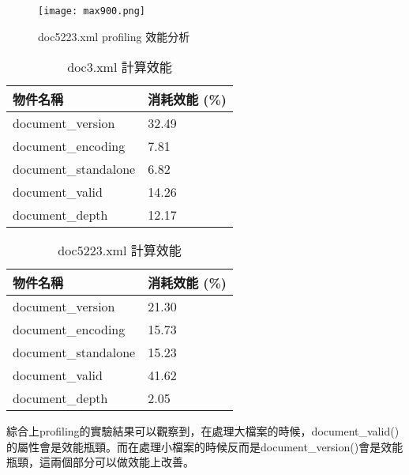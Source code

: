 \begin{figure}[H]
\centering
\graphicspath{{/Users/FUDA/Documents/masterThesis/image/}}
\texttt{[image: max900.png]}
\caption{doc5223.xml profiling 效能分析}
\label{max900}
\end{figure}

\begin{table}[H]
\caption{doc3.xml 計算效能}
\label{doc3pro}
\begin{center}
\begin{tabular}{|p{4cm}<{\centering}|p{3cm}<{\centering}|}
\hline
物件名稱 & 消耗效能 (\%)\\
\hline
document\_version & 32.49 \\
\hline
document\_encoding & 7.81 \\
\hline
document\_standalone & 6.82 \\
\hline
document\_valid & 14.26 \\
\hline
document\_depth & 12.17 \\
\hline
\end{tabular}
\end{center}
\end{table}

\begin{table}[H]
\caption{doc5223.xml 計算效能}
\label{doc5223pro}
\begin{center}
\begin{tabular}{|p{4cm}<{\centering}|p{3cm}<{\centering}|}
\hline
物件名稱 & 消耗效能 (\%)\\
\hline
document\_version & 21.30 \\
\hline
document\_encoding & 15.73 \\
\hline
document\_standalone & 15.23 \\
\hline
document\_valid & 41.62 \\
\hline
document\_depth & 2.05 \\
\hline
\end{tabular}
\end{center}
\end{table}

綜合上profiling的實驗結果可以觀察到，在處理大檔案的時候，document\_valid()的屬性會是效能瓶頸。而在處理小檔案的時候反而是document\_version()會是效能瓶頸，這兩個部分可以做效能上改善。
\newpage